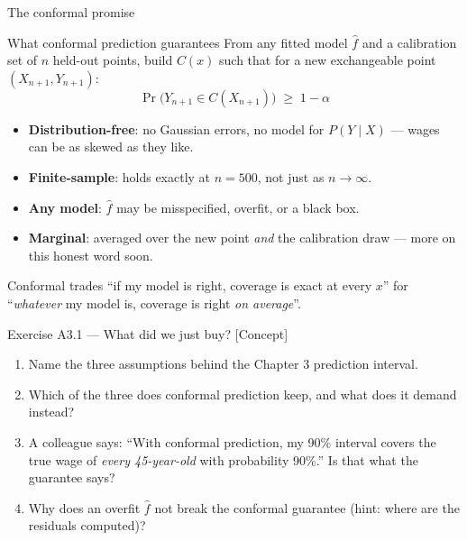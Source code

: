 \documentclass[aspectratio=169,11pt]{beamer}
\begin{document}
\begin{frame}{The conformal promise}
  \footnotesize
  \begin{block}{What conformal prediction guarantees}
    From any fitted model $\hat f$ and a calibration set of $n$ held-out points, build
    $C(x)$ such that for a new exchangeable point $(X_{n+1}, Y_{n+1})$:
    \[
      \boxed{\;\Pr\big(Y_{n+1} \in C(X_{n+1})\big) \;\ge\; 1 - \alpha\;}
    \]
  \end{block}
  \footnotesize
  \begin{readme}
    \begin{itemize}
      \item \textbf{Distribution-free}: no Gaussian errors, no model for
            $P(Y \mid X)$ --- wages can be as skewed as they like.
      \item \textbf{Finite-sample}: holds exactly at $n = 500$, not just as
            $n \to \infty$.
      \item \textbf{Any model}: $\hat f$ may be misspecified, overfit, or a black box.
      \item \textbf{Marginal}: averaged over the new point \emph{and} the calibration
            draw --- more on this honest word soon.
    \end{itemize}
  \end{readme}
  \begin{takeaway}
    Conformal trades ``if my model is right, coverage is exact at every $x$'' for
    ``\emph{whatever} my model is, coverage is right \emph{on average}''.
  \end{takeaway}
\end{frame}

\begin{frame}{Exercise A3.1 --- What did we just buy? [Concept]}
\begin{exercise}
  \begin{enumerate}
    \item Name the three assumptions behind the Chapter 3 prediction interval.
    \item Which of the three does conformal prediction keep, and what does it demand
          instead?
    \item A colleague says: ``With conformal prediction, my 90\% interval covers the
          true wage of \emph{every 45-year-old} with probability 90\%.'' Is that what
          the guarantee says?
    \item Why does an overfit $\hat f$ not break the conformal guarantee (hint: where
          are the residuals computed)?
  \end{enumerate}
\end{exercise}
\end{frame}
\end{document}
